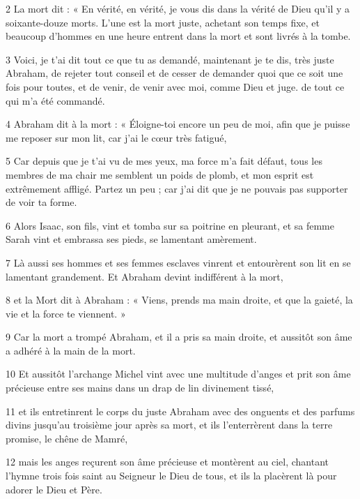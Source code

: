 \par 2 La mort dit : « En vérité, en vérité, je vous dis dans la vérité de Dieu qu'il y a soixante-douze morts. L'une est la mort juste, achetant son temps fixe, et beaucoup d'hommes en une heure entrent dans la mort et sont livrés à la tombe.

\par 3 Voici, je t'ai dit tout ce que tu as demandé, maintenant je te dis, très juste Abraham, de rejeter tout conseil et de cesser de demander quoi que ce soit une fois pour toutes, et de venir, de venir avec moi, comme Dieu et juge. de tout ce qui m’a été commandé.

\par 4 Abraham dit à la mort : « Éloigne-toi encore un peu de moi, afin que je puisse me reposer sur mon lit, car j'ai le cœur très fatigué,

\par 5 Car depuis que je t'ai vu de mes yeux, ma force m'a fait défaut, tous les membres de ma chair me semblent un poids de plomb, et mon esprit est extrêmement affligé. Partez un peu ; car j’ai dit que je ne pouvais pas supporter de voir ta forme.

\par 6 Alors Isaac, son fils, vint et tomba sur sa poitrine en pleurant, et sa femme Sarah vint et embrassa ses pieds, se lamentant amèrement.

\par 7 Là aussi ses hommes et ses femmes esclaves vinrent et entourèrent son lit en se lamentant grandement. Et Abraham devint indifférent à la mort,

\par 8 et la Mort dit à Abraham : « Viens, prends ma main droite, et que la gaieté, la vie et la force te viennent. »

\par 9 Car la mort a trompé Abraham, et il a pris sa main droite, et aussitôt son âme a adhéré à la main de la mort.

\par 10 Et aussitôt l'archange Michel vint avec une multitude d'anges et prit son âme précieuse entre ses mains dans un drap de lin divinement tissé,

\par 11 et ils entretinrent le corps du juste Abraham avec des onguents et des parfums divins jusqu'au troisième jour après sa mort, et ils l'enterrèrent dans la terre promise, le chêne de Mamré,

\par 12 mais les anges reçurent son âme précieuse et montèrent au ciel, chantant l'hymne trois fois saint au Seigneur le Dieu de tous, et ils la placèrent là pour adorer le Dieu et Père.

